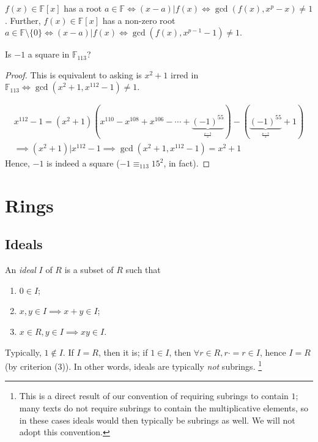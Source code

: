 \documentclass[12pt,oneside]{article}
\begin{document}
\begin{proposition}
  $f(x) \in \mathbb{F}[x]$ has a root $a \in \mathbb{F} \iff (x-a)|f(x) \iff \gcd (f(x), x^p - x) \neq 1$. Further, $f(x) \in \mathbb{F}[x]$ has a non-zero root $a \in \mathbb{F}\setminus \{0\} \iff (x-a) | f(x) \iff \gcd (f(x), x^{p-1} - 1) \neq 1$.
\end{proposition}

\begin{example}
  Is $-1$ a square in $\mathbb{F}_{113}$? \footnotemark
\end{example}


\begin{proof}
  This is equivalent to asking is $x^2 + 1$ irred in $\mathbb{F}_{113} \iff \gcd (x^2 + 1, x^{112} - 1) \neq 1$.

  \begin{align*}
    x^{112} - 1 = (x^2 + 1)(x^{110} - x^{108}+x^{106} - \cdots + \underbrace{(-1)^{55}}_{^\frac{p-3}{2}}) - (\underbrace{(-1)^{55}}_{^\frac{p-3}{2}} + 1)\\
    \implies (x^2+1)| x^{112} -1 \implies \gcd(x^2 + 1, x^{112} - 1) = x^2 +1
  \end{align*}
  Hence, $-1$ is indeed a square ($-1 \equiv_{113} 15^2$, in fact).
\end{proof}

\section{Rings}

\subsection{Ideals}

\begin{definition}[Ideal]\label{def:ideal}
  An \emph{ideal} $I$ of $R$ is a subset of $R$ such that 
  \begin{enumerate}
    \item $0 \in I$;
    \item $x,y \in I \implies x + y \in I$;
    \item $x \in R, y \in I \implies xy \in I$. 
  \end{enumerate}
\end{definition}

\begin{remark}
  Typically, $1 \notin I$. If $I = R$, then it is; if $1 \in I$, then $\forall r \in R, r \cdot = r \in I$, hence $I = R$ (by criterion (3)). In other words, ideals are typically \emph{not} subrings. \footnote{This is a direct result of our convention of requiring subrings to contain $1$; many texts do not require subrings to contain the multiplicative elements, so in these cases ideals would then typically be subrings as well. We will not adopt this convention.}
\end{remark}
\end{document}

